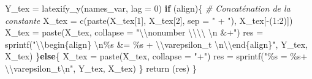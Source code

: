 \documentclass[
  11pt,
]{article}
\newenvironment{Shaded}{\begin{snugshade}}{\end{snugshade}}
\newcommand{\AttributeTok}[1]{\textcolor[rgb]{0.77,0.63,0.00}{#1}}
\newcommand{\CommentTok}[1]{\textcolor[rgb]{0.56,0.35,0.01}{\textit{#1}}}
\newcommand{\ControlFlowTok}[1]{\textcolor[rgb]{0.13,0.29,0.53}{\textbf{#1}}}
\newcommand{\DecValTok}[1]{\textcolor[rgb]{0.00,0.00,0.81}{#1}}
\newcommand{\FunctionTok}[1]{\textcolor[rgb]{0.00,0.00,0.00}{#1}}
\newcommand{\NormalTok}[1]{#1}
\newcommand{\OtherTok}[1]{\textcolor[rgb]{0.56,0.35,0.01}{#1}}
\newcommand{\SpecialCharTok}[1]{\textcolor[rgb]{0.00,0.00,0.00}{#1}}
\newcommand{\StringTok}[1]{\textcolor[rgb]{0.31,0.60,0.02}{#1}}
\begin{document}
\begin{Shaded}
\begin{Highlighting}[]
\NormalTok{    Y\_tex }\OtherTok{=} \FunctionTok{latexify\_y}\NormalTok{(names\_var, }\AttributeTok{lag =} \DecValTok{0}\NormalTok{)}
    \ControlFlowTok{if}\NormalTok{ (align)\{}
        \CommentTok{\# Concaténation de la constante}
\NormalTok{        X\_tex }\OtherTok{=} \FunctionTok{c}\NormalTok{(}\FunctionTok{paste}\NormalTok{(X\_tex[}\DecValTok{1}\NormalTok{], X\_tex[}\DecValTok{2}\NormalTok{], }\AttributeTok{sep =} \StringTok{" + "}\NormalTok{),}
\NormalTok{                  X\_tex[}\SpecialCharTok{{-}}\NormalTok{(}\DecValTok{1}\SpecialCharTok{:}\DecValTok{2}\NormalTok{)])}
\NormalTok{        X\_tex }\OtherTok{=} \FunctionTok{paste}\NormalTok{(X\_tex,}
                      \AttributeTok{collapse =} \StringTok{"}\SpecialCharTok{\textbackslash{}\textbackslash{}}\StringTok{nonumber }\SpecialCharTok{\textbackslash{}\textbackslash{}\textbackslash{}\textbackslash{}}\StringTok{ }\SpecialCharTok{\textbackslash{}n}\StringTok{ \&+"}\NormalTok{)}
\NormalTok{        res }\OtherTok{=} \FunctionTok{sprintf}\NormalTok{(}\StringTok{"}\SpecialCharTok{\textbackslash{}\textbackslash{}}\StringTok{begin\{align\} }\SpecialCharTok{\textbackslash{}n}\StringTok{\%s \&= \%s + }\SpecialCharTok{\textbackslash{}\textbackslash{}}\StringTok{varepsilon\_t }\SpecialCharTok{\textbackslash{}n\textbackslash{}\textbackslash{}}\StringTok{end\{align\}"}\NormalTok{,}
\NormalTok{                      Y\_tex, X\_tex)}
\NormalTok{    \}}\ControlFlowTok{else}\NormalTok{\{}
\NormalTok{        X\_tex }\OtherTok{=} \FunctionTok{paste}\NormalTok{(X\_tex,}
                      \AttributeTok{collapse =} \StringTok{"+"}\NormalTok{)}
\NormalTok{        res }\OtherTok{=} \FunctionTok{sprintf}\NormalTok{(}\StringTok{"\%s = \%s+ }\SpecialCharTok{\textbackslash{}\textbackslash{}}\StringTok{varepsilon\_t}\SpecialCharTok{\textbackslash{}n}\StringTok{"}\NormalTok{,}
\NormalTok{                      Y\_tex, X\_tex)}
\NormalTok{    \}}
    \FunctionTok{return}\NormalTok{ (res)}
\NormalTok{\}}


\end{Highlighting}
\end{Shaded}
\end{document}
